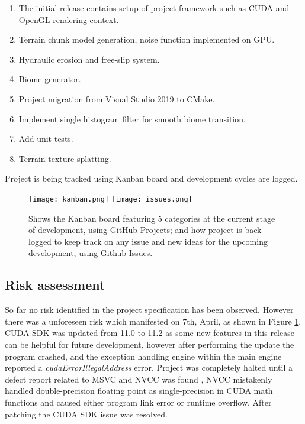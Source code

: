 \documentclass[oneside, a4paper]{article}
\begin{document}
    \begin{enumerate}[label=v0.\arabic*]
        \item The initial release contains setup of project framework such as CUDA and OpenGL rendering context.
        \item Terrain chunk model generation, noise function implemented on GPU.
        \item Hydraulic erosion and free-slip system.
        \item Biome generator.
        \item Project migration from Visual Studio 2019 to CMake.
        \item Implement single histogram filter for smooth biome transition.
        \item Add unit tests.
        \item Terrain texture splatting.
    \end{enumerate}

    Project is being tracked using Kanban board and development cycles are logged.
    
    \begin{figure}[H]
        \texttt{[image: kanban.png]}
        \texttt{[image: issues.png]}
        \caption{Shows the Kanban board featuring 5 categories at the current stage of development, using GitHub Projects; and how project is back-logged to keep track on any issue and new ideas for the upcoming development, using Github Issues.}
        \label{log}
    \end{figure}

    \subsection{Risk assessment}
    So far no risk identified in the project specification has been observed. However there was a unforeseen risk which manifested on 7th, April, as shown in Figure \ref{log}. CUDA SDK was updated from 11.0 to 11.2 as some new features in this release can be helpful for future development, however after performing the update the program crashed, and the exception handling engine within the main engine reported a \textit{cudaErrorIllegalAddress} error. Project was completely halted until a defect report related to MSVC and NVCC was found \cite{cuda1102_defect}, NVCC mistakenly handled double-precision floating point as single-precision in CUDA math functions and caused either program link error or runtime overflow. After patching the CUDA SDK issue was resolved.
\end{document}
